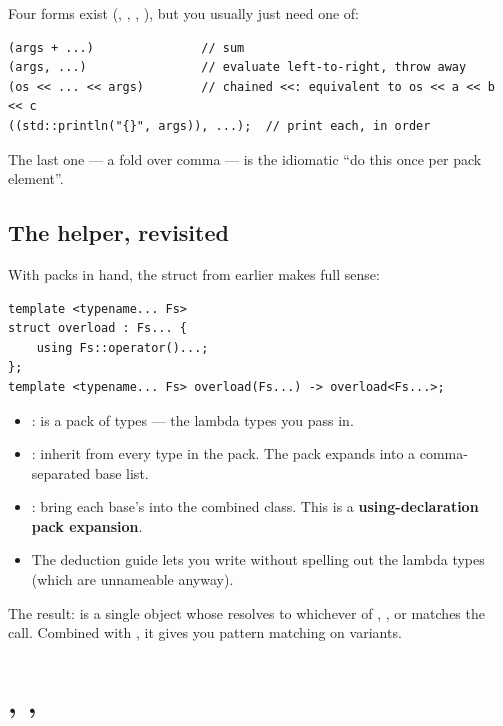 Four forms exist (,
, ,
), but you usually just need one of:

\begin{lstlisting}
(args + ...)               // sum
(args, ...)                // evaluate left-to-right, throw away
(os << ... << args)        // chained <<: equivalent to os << a << b << c
((std::println("{}", args)), ...);  // print each, in order
\end{lstlisting}

The last one --- a fold over comma --- is the idiomatic ``do this
once per pack element''.

\subsection{The  helper, revisited}

With packs in hand, the  struct from earlier makes
full sense:

\begin{lstlisting}
template <typename... Fs>
struct overload : Fs... {
    using Fs::operator()...;
};
template <typename... Fs> overload(Fs...) -> overload<Fs...>;
\end{lstlisting}

\begin{itemize}[leftmargin=*]
  \item {}:  is a pack of
    types --- the lambda types you pass in.
  \item {}: inherit from every type in
    the pack. The pack expands into a comma-separated base list.
  \item {}: bring each base's
     into the combined class. This is a
    \textbf{using-declaration pack expansion}.
  \item The deduction guide 
    lets you write  without
    spelling out the lambda types (which are unnameable anyway).
\end{itemize}

The result:  is a single object whose
 resolves to whichever of , , or
 matches the call. Combined with , it gives
you pattern matching on variants.

\section{, , }
\label{sec:cpp:constexpr}


